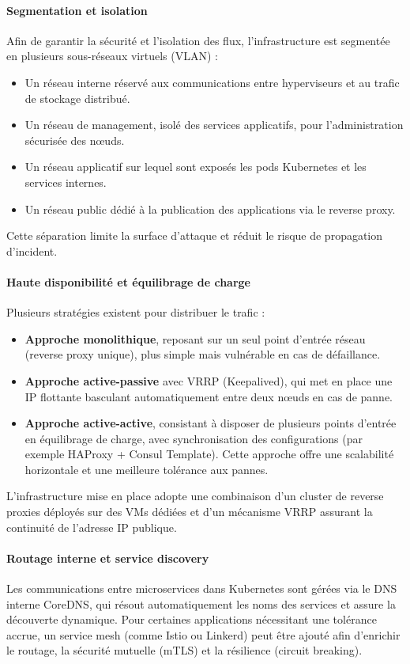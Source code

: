 \paragraph{Segmentation et isolation}
Afin de garantir la sécurité et l’isolation des flux, l’infrastructure est segmentée en plusieurs sous-réseaux virtuels (VLAN) :
\begin{itemize}
	\item Un réseau interne réservé aux communications entre hyperviseurs et au trafic de stockage distribué.
	\item Un réseau de management, isolé des services applicatifs, pour l’administration sécurisée des nœuds.
	\item Un réseau applicatif sur lequel sont exposés les pods Kubernetes et les services internes.
	\item Un réseau public dédié à la publication des applications via le reverse proxy.
\end{itemize}
Cette séparation limite la surface d’attaque et réduit le risque de propagation d’incident.

\paragraph{Haute disponibilité et équilibrage de charge}
Plusieurs stratégies existent pour distribuer le trafic :
\begin{itemize}
	\item \textbf{Approche monolithique}, reposant sur un seul point d’entrée réseau (reverse proxy unique), plus simple mais vulnérable en cas de défaillance.
	\item \textbf{Approche active-passive} avec VRRP (Keepalived), qui met en place une IP flottante basculant automatiquement entre deux nœuds en cas de panne.
	\item \textbf{Approche active-active}, consistant à disposer de plusieurs points d’entrée en équilibrage de charge, avec synchronisation des configurations (par exemple HAProxy + Consul Template). Cette approche offre une scalabilité horizontale et une meilleure tolérance aux pannes.
\end{itemize}
L’infrastructure mise en place adopte une combinaison d’un cluster de reverse proxies déployés sur des VMs dédiées et d’un mécanisme VRRP assurant la continuité de l’adresse IP publique.

\paragraph{Routage interne et service discovery}
Les communications entre microservices dans Kubernetes sont gérées via le DNS interne CoreDNS, qui résout automatiquement les noms des services et assure la découverte dynamique. Pour certaines applications nécessitant une tolérance accrue, un service mesh (comme Istio ou Linkerd) peut être ajouté afin d’enrichir le routage, la sécurité mutuelle (mTLS) et la résilience (circuit breaking).

